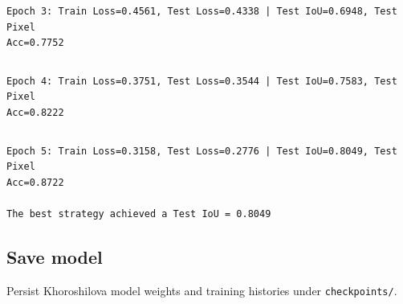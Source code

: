 \documentclass[11pt]{article}
\begin{document}
    \begin{Verbatim}[commandchars=\\\{\}]

    \end{Verbatim}

    \begin{Verbatim}[commandchars=\\\{\}]
Epoch 3: Train Loss=0.4561, Test Loss=0.4338 | Test IoU=0.6948, Test Pixel
Acc=0.7752
    \end{Verbatim}

    \begin{Verbatim}[commandchars=\\\{\}]

    \end{Verbatim}

    \begin{Verbatim}[commandchars=\\\{\}]
Epoch 4: Train Loss=0.3751, Test Loss=0.3544 | Test IoU=0.7583, Test Pixel
Acc=0.8222
    \end{Verbatim}

    \begin{Verbatim}[commandchars=\\\{\}]

    \end{Verbatim}

    \begin{Verbatim}[commandchars=\\\{\}]
Epoch 5: Train Loss=0.3158, Test Loss=0.2776 | Test IoU=0.8049, Test Pixel
Acc=0.8722

The best strategy achieved a Test IoU = 0.8049
    \end{Verbatim}

    \subsection{Save model}\label{save-model}

Persist Khoroshilova model weights and training histories under
\texttt{checkpoints/}.
\end{document}
